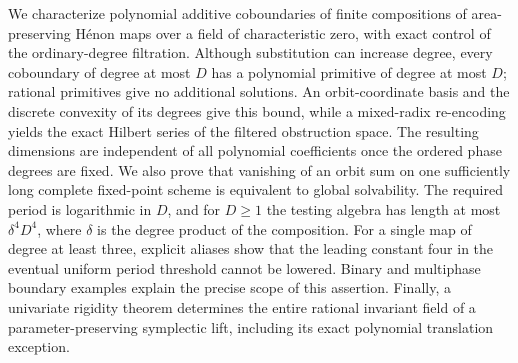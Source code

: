 We characterize polynomial additive coboundaries of finite compositions of
area-preserving H\'enon maps over a field of characteristic zero, with exact
control of the ordinary-degree filtration. Although substitution can increase
degree, every coboundary of degree at most $D$ has a polynomial primitive of
degree at most $D$; rational primitives give no additional solutions. An
orbit-coordinate basis and the discrete convexity of its degrees give this
bound, while a mixed-radix re-encoding yields the exact Hilbert series of the
filtered obstruction space. The resulting dimensions are independent of all
polynomial coefficients once the ordered phase degrees are fixed. We also prove
that vanishing of an orbit sum on one sufficiently long complete fixed-point
scheme is equivalent to global solvability. The required period is logarithmic
in $D$, and for $D\ge1$ the testing algebra has length at most $\delta^4D^4$, where
$\delta$ is the degree product of the composition. For a single map of degree
at least three, explicit aliases show that the leading constant four in the
eventual uniform period threshold cannot be lowered. Binary and multiphase
boundary examples explain the precise scope of this assertion. Finally, a
univariate rigidity theorem determines the entire rational invariant field of
a parameter-preserving symplectic lift, including its exact polynomial
translation exception.

